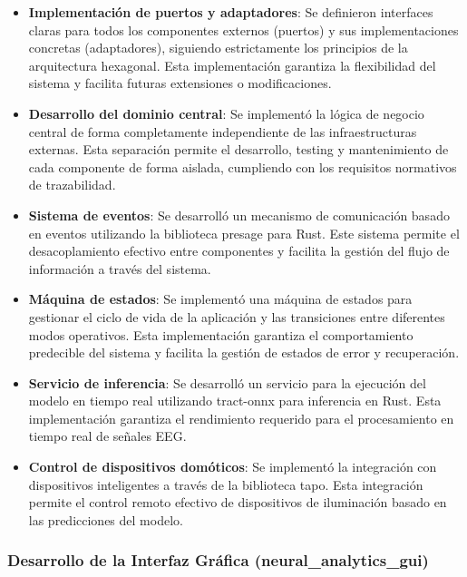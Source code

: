 \begin{itemize}
    \item \textbf{Implementación de puertos y adaptadores}: Se definieron interfaces claras para todos los componentes externos (puertos) y sus implementaciones concretas (adaptadores), siguiendo estrictamente los principios de la arquitectura hexagonal. Esta implementación garantiza la flexibilidad del sistema y facilita futuras extensiones o modificaciones.
    
    \item \textbf{Desarrollo del dominio central}: Se implementó la lógica de negocio central de forma completamente independiente de las infraestructuras externas. Esta separación permite el desarrollo, testing y mantenimiento de cada componente de forma aislada, cumpliendo con los requisitos normativos de trazabilidad.
    
    \item \textbf{Sistema de eventos}: Se desarrolló un mecanismo de comunicación basado en eventos utilizando la biblioteca presage para Rust. Este sistema permite el desacoplamiento efectivo entre componentes y facilita la gestión del flujo de información a través del sistema.
    
    \item \textbf{Máquina de estados}: Se implementó una máquina de estados para gestionar el ciclo de vida de la aplicación y las transiciones entre diferentes modos operativos. Esta implementación garantiza el comportamiento predecible del sistema y facilita la gestión de estados de error y recuperación.
    
    \item \textbf{Servicio de inferencia}: Se desarrolló un servicio para la ejecución del modelo en tiempo real utilizando tract-onnx para inferencia en Rust. Esta implementación garantiza el rendimiento requerido para el procesamiento en tiempo real de señales EEG.
    
    \item \textbf{Control de dispositivos domóticos}: Se implementó la integración con dispositivos inteligentes a través de la biblioteca tapo. Esta integración permite el control remoto efectivo de dispositivos de iluminación basado en las predicciones del modelo.
\end{itemize}

\subsubsection{Desarrollo de la Interfaz Gráfica (neural\_analytics\_gui)}

